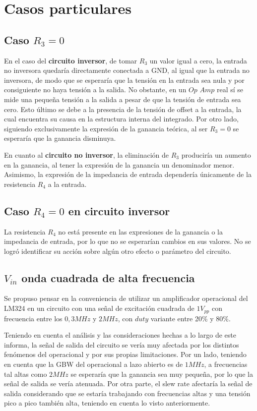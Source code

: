 \section{Casos particulares}

\subsection{Caso $R_{3}=0$}

En el caso del \textbf{circuito inversor}, de tomar $R_{3}$ un valor igual a cero, la entrada no inversora quedaría directamente conectada a GND, al igual que la entrada no inversora, de modo que se esperaría que la tensión en la entrada sea nula y por consiguiente no haya tensión a la salida. No obstante, en un $Op$ $Amp$ real sí se mide una pequeña tensión a la salida a pesar de que la tensión de entrada sea cero. Esto último se debe a la presencia de la tensión de offset a la entrada, la cual encuentra su causa en la estructura interna del integrado. Por otro lado, siguiendo exclusivamente la expresión de la ganancia teórica, al ser $R_{3}=0$ se esperaría que la ganancia disminuya. 

En cuanto al \textbf{circuito no inversor}, la eliminación de $R_{3}$ produciría un aumento en la ganancia, al tener la expresión de la ganancia un denominador menor. Asimismo, la expresión de la impedancia de entrada dependería únicamente de la resistencia $R_{4}$ a la entrada. 

\subsection{Caso $R_{4}=0$ en circuito inversor}

La resistencia $R_{4}$ no está presente en las expresiones de la ganancia o la impedancia de entrada, por lo que no se esperarían cambios en sus valores. No se logró identificar su acción sobre algún otro efecto o parámetro del circuito.  

\subsection{$V_{in}$ onda cuadrada de alta frecuencia}

Se propuso pensar en la conveniencia de utilizar un amplificador operacional del LM324 en un circuito con una señal de excitación cuadrada de $1V_{pp}$ con frecuencia entre los $0,3MHz$ y $2MHz$, con $duty$ variante entre 20\% y 80\%. 

Teniendo en cuenta el análisis y las consideraciones hechas a lo largo de este informa, la señal de salida del circuito se vería muy afectada por los distintos fenómenos del operacional y por sus propias limitaciones. Por un lado, teniendo en cuenta que la GBW del operacional a lazo abierto es de $1MHz$, a frecuencias tal altas como $2MHz$ se esperaría que la ganancia sea muy pequeña, por lo que la señal de salida se vería atenuada. Por otra parte, el slew rate afectaría la señal de salida considerando que se estaría trabajando con frecuencias altas y una tensión pico a pico también alta, teniendo en cuenta lo visto anteriormente. 

